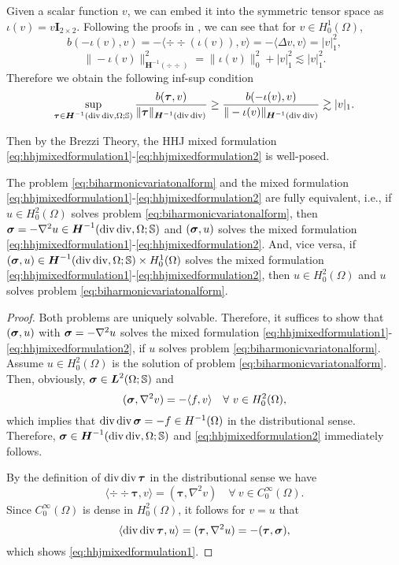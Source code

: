 Given a scalar function $v$, we can embed it into the symmetric tensor space as $\iota (v) = v \boldsymbol I_{2\times 2}$. Following the proofs in \cite{BoffiBrezziFortin2013,BrezziRaviart1977}, we can see that for $v\in H_0^1(\Omega)$,
\[
b(-\iota(v), v)=-\langle \div\div(\iota(v)), v\rangle=-\langle \Delta v, v\rangle=|v|_1^2,
\]
\[
\|-\iota(v)\|_{\boldsymbol{H}^{-1}(\div\div)}^2=\|\iota(v)\|_0^2+|v|_1^2\lesssim |v|_1^2.
\]
Therefore we obtain the following inf-sup condition
\[
\sup_{\boldsymbol\tau\in\boldsymbol{H}^{-1}(\operatorname{div}\operatorname{div},\Omega; \mathbb{S})}\frac{b(\boldsymbol\tau, v)}{\|\boldsymbol\tau\|_{\boldsymbol{H}^{-1}(\operatorname{div}\operatorname{div})}}\geq\frac{b(-\iota(v), v)}{\|-\iota(v)\|_{\boldsymbol{H}^{-1}(\operatorname{div}\operatorname{div})}}\gtrsim |v|_1.
\]

Then by the Brezzi Theory, the HHJ mixed formulation \eqref{eq:hhjmixedformulation1}-\eqref{eq:hhjmixedformulation2} is well-posed.

\begin{lemma}
The problem \eqref{eq:biharmonicvariatonalform} and the mixed formulation \eqref{eq:hhjmixedformulation1}-\eqref{eq:hhjmixedformulation2} are fully equivalent, i.e., if $u\in H_0^2(\Omega)$ solves problem \eqref{eq:biharmonicvariatonalform}, then $\boldsymbol\sigma=-\nabla^2 u\in \boldsymbol{H}^{-1}(\operatorname{div}\operatorname{div},\Omega; \mathbb{S})$ and $(\boldsymbol\sigma, u)$ solves the mixed formulation \eqref{eq:hhjmixedformulation1}-\eqref{eq:hhjmixedformulation2}. And, vice versa, if $(\boldsymbol\sigma, u)\in \boldsymbol{H}^{-1}(\operatorname{div}\operatorname{div},\Omega; \mathbb{S})\times H_0^1(\Omega)$ solves the mixed formulation \eqref{eq:hhjmixedformulation1}-\eqref{eq:hhjmixedformulation2}, then $u\in H_0^2(\Omega)$ and $u$ solves problem \eqref{eq:biharmonicvariatonalform}.
\end{lemma}
\begin{proof}
Both problems are uniquely solvable. Therefore, it suffices to show that $(\boldsymbol\sigma, u)$ with $\boldsymbol\sigma=-\nabla^2 u$ solves the mixed formulation \eqref{eq:hhjmixedformulation1}-\eqref{eq:hhjmixedformulation2}, if $u$ solves problem \eqref{eq:biharmonicvariatonalform}. Assume $u\in H_0^2(\Omega)$ is the solution of problem \eqref{eq:biharmonicvariatonalform}.
Then, obviously, $\boldsymbol\sigma\in\boldsymbol{L}^{2}(\Omega; \mathbb{S})$ and
\[
(\boldsymbol\sigma, \nabla^2v)=-\langle f, v\rangle\quad\forall~v\in H_0^2(\Omega),
\]
which implies that $\operatorname{div}\operatorname{div}\boldsymbol\sigma=-f\in H^{-1}(\Omega)$ in the distributional sense. Therefore, $\boldsymbol\sigma\in \boldsymbol{H}^{-1}(\operatorname{div}\operatorname{div},\Omega; \mathbb{S})$ and \eqref{eq:hhjmixedformulation2} immediately follows.

By the definition of $\operatorname{div}\operatorname{div}\boldsymbol\tau$ in the distributional sense we have
\[
\langle \div\div\boldsymbol\tau, v\rangle=(\boldsymbol\tau, \nabla^2v)\quad\forall~v\in C_0^{\infty}(\Omega).
\]
Since $C_0^{\infty}(\Omega)$ is dense in $H_0^2(\Omega)$, it follows for $v=u$ that
\[
\langle \operatorname{div}\operatorname{div}\boldsymbol\tau, u\rangle=(\boldsymbol\tau, \nabla^2u)=-(\boldsymbol\tau, \boldsymbol\sigma),
\]
which shows \eqref{eq:hhjmixedformulation1}.
\end{proof}

